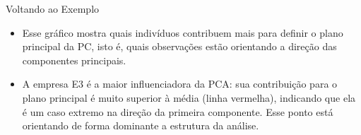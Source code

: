 \documentclass[
  ignorenonframetext,
  aspectratio=169,
]{beamer}
\providecommand{\tightlist}{%
  \setlength{\itemsep}{0pt}\setlength{\parskip}{0pt}}
\begin{document}
\begin{frame}{Voltando ao Exemplo}
\label{voltando-ao-exemplo-18}
\begin{itemize}
\tightlist
\item
  Esse gráfico mostra quais indivíduos contribuem mais para definir o
  plano principal da PC, isto é, quais observações estão orientando a
  direção das componentes principais.
\end{itemize}

\pause

\begin{itemize}
\tightlist
\item
  A empresa E3 é a maior influenciadora da PCA: sua contribuição para o
  plano principal é muito superior à média (linha vermelha), indicando
  que ela é um caso extremo na direção da primeira componente. Esse
  ponto está orientando de forma dominante a estrutura da análise.
\end{itemize}
\end{frame}
\end{document}
